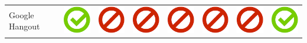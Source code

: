 \documentclass[10pt,foldmark,tumble]{leaflet}
\begin{document}
{\begin{tabular}{ L{2cm} | C{2cm} | C{2cm} | C{2cm} | C{2cm} | C{2cm} | C{2cm} | C{2cm} | }
Google Hangout & \includegraphics[scale=0.1]{pics/haken.png} & \includegraphics[scale=0.1]{pics/nohaken.png} & \includegraphics[scale=0.1]{pics/nohaken.png} & \includegraphics[scale=0.1]{pics/nohaken.png} & \includegraphics[scale=0.1]{pics/nohaken.png} & \includegraphics[scale=0.1]{pics/nohaken.png} & \includegraphics[scale=0.1]{pics/haken.png} \tabularnewline

\end{tabular}}
\end{document}
